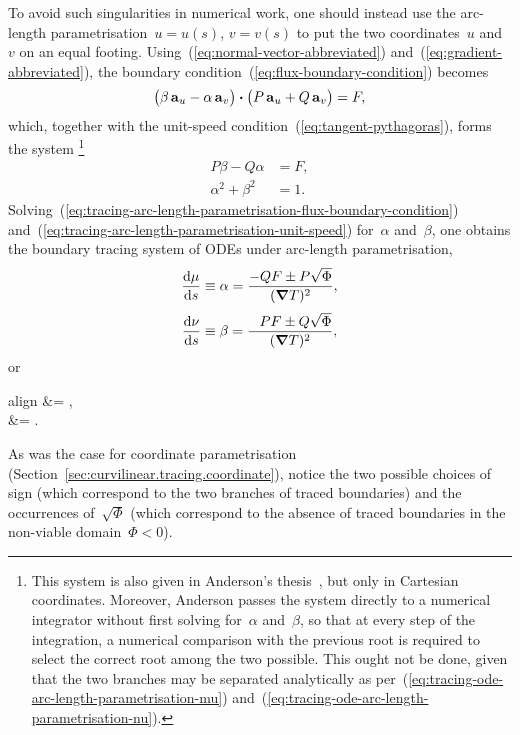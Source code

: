 To avoid such singularities in numerical work, one should instead use
the arc-length parametrisation~$u = u (s)$, $v = v(s)$
to put the two coordinates~$u$ and~$v$ on an equal footing.
Using~(\ref{eq:normal-vector-abbreviated})
and~(\ref{eq:gradient-abbreviated}),
the boundary condition~(\ref{eq:flux-boundary-condition}) becomes
\[
  \roundbr[\big]{\beta \basisvec{u} - \alpha \basisvec{v}}
    \dotp
  \roundbr[\big]{P \basisvec{u} + Q \basisvec{v}}
    =
  F,
\]
which, together with the unit-speed condition~(\ref{eq:tangent-pythagoras}),
forms the system%
\footnote{
  This system is also given
  in Anderson's thesis~\cite{anderson-2002-thesis-boundary-tracing-pdes},
  but only in Cartesian coordinates.
  Moreover, Anderson passes the system directly to a numerical integrator
  without first solving for~$\alpha$ and~$\beta$,
  so that at every step of the integration,
  a numerical comparison with the previous root
  is required to select the correct root among the two possible.
  This ought not be done,
  given that the two branches may be separated analytically
  as per~(\ref{eq:tracing-ode-arc-length-parametrisation-mu})
  and~(\ref{eq:tracing-ode-arc-length-parametrisation-nu}).
}
\begin{align}
  P \beta - Q \alpha &= F,
    \label{eq:tracing-arc-length-parametrisation-flux-boundary-condition} \\
  \alpha^2 + \beta^2 &= 1.
    \label{eq:tracing-arc-length-parametrisation-unit-speed}
\end{align}
Solving~(\ref{eq:tracing-arc-length-parametrisation-flux-boundary-condition})
and~(\ref{eq:tracing-arc-length-parametrisation-unit-speed})
for~$\alpha$ and~$\beta$, one obtains
the boundary tracing system of ODEs under arc-length parametrisation,
\begin{align}
  \tder{\mu}{s} &\defeq \alpha = \frac{-Q F \pm P \sqrt{\Phi}}{(\del T)^2},
    \label{eq:tracing-ode-arc-length-parametrisation-mu} \\[\fraclinespace]
  \tder{\nu}{s} &\defeq \beta = \frac{\+P F \pm Q \sqrt{\Phi}}{(\del T)^2},
    \label{eq:tracing-ode-arc-length-parametrisation-nu}
\end{align}
or
\begin{important}{align}
   &= ,
    \label{eq:tracing-ode-arc-length-parametrisation-u} \\[\fraclinespace]
   &= .
    \label{eq:tracing-ode-arc-length-parametrisation-v}
\end{important}
As was the case for coordinate parametrisation
(Section~\ref{sec:curvilinear.tracing.coordinate}),
notice the two possible choices of sign
(which correspond to the two branches of traced boundaries)
and the occurrences of~$\sqrt{\Phi}$
(which correspond to the absence of traced boundaries
in the non-viable domain~$\Phi < 0$).

